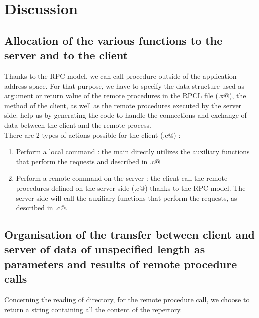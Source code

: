 \documentclass{article}
\begin{document}
\newpage


\section{Discussion}

\subsection{Allocation of the various functions to the server and to the client}
Thanks to the RPC model, we can call procedure outside of the application address space. For that purpose, we have to specify the data structure used as argument or return value of the remote procedures in the RPCL file (\verb@rpspec.x@), the \verb@main@ method of the client, as well as the remote procedures executed by the server side. \verb@RPCGEN@ help us by generating the code to handle the connections and exchange of data between the client and the remote process.\\

There are 2 types of actions possible for the client (\verb@myftp.c@) :
\begin{enumerate}
\item Perform a local command : the main directly utilizes the auxiliary functions that perform the requests and described in \verb@utils.c@
\item Perform a remote command on the server : the client call the remote procedures defined on the server side (\verb@myftpd.c@) thanks to the RPC model. The server side will call the auxiliary functions that perform the requests, as described in \verb@utils.c@.
\end{enumerate}

\subsection{Organisation of the transfer between client and server of data of unspecified length as parameters and results of remote procedure calls}
Concerning the reading of directory, for the \verb@ls@ remote procedure call, we choose to return a string containing all the content of the repertory.\\
\end{document}
